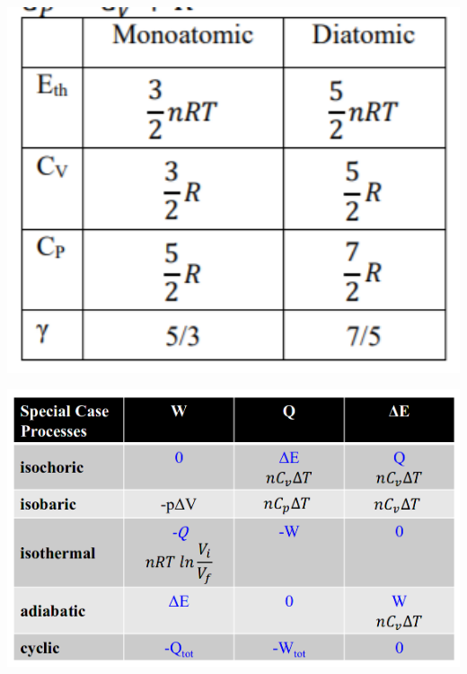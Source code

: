 \documentclass[12pt, letterpaper]{article}
\begin{document}
\includegraphics[width=15cm]{thermo_constants}

\includegraphics{thermo_procedures}
\end{document}
